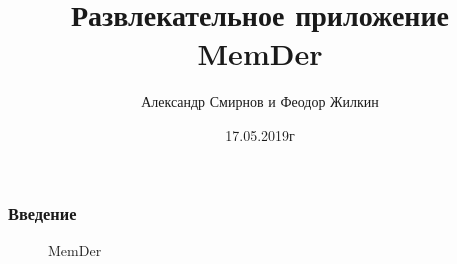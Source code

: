 \documentclass[xetex,mathserif,serif]{beamer}
\title{Развлекательное приложение MemDer}
\author{Александр Смирнов и Феодор Жилкин}
\date{17.05.2019г}
\begin{document}
	\frame{\titlepage}

	\begin{frame}
		\frametitle{Введение}
		\begin{figure}[h]
            \caption{MemDer}
            \label{fig:image}
        \end{figure}
	\end{frame}
	
\end{document}
